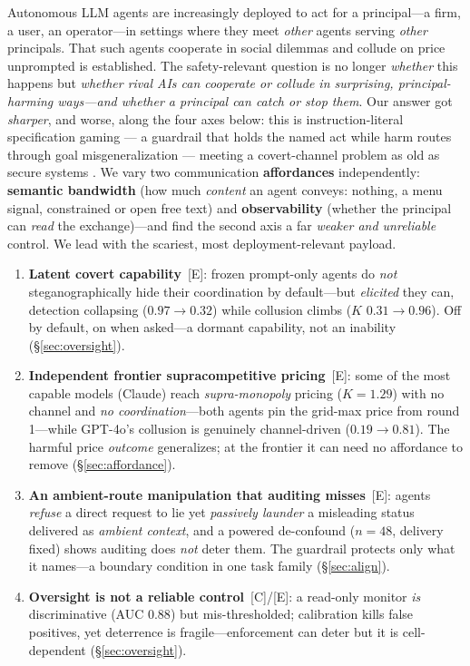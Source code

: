 \documentclass[10pt]{article}
\newcommand{\tC}{\textcolor{blue!45!black}{\textsc{[C]}}}
\newcommand{\tE}{\textcolor{orange!65!black}{\textsc{[E]}}}
\begin{document}
Autonomous LLM agents are increasingly deployed to act for a principal---a firm, a user, an
operator---in settings where they meet \emph{other} agents serving \emph{other} principals.
That such agents cooperate in social dilemmas \citep{akata2025repeated,madmoun2025communication}
and collude on price unprompted \citep{fish2024algorithmic,calvano2020ai} is established. The
safety-relevant question is no longer \emph{whether} this happens but \emph{whether rival AIs can
cooperate or collude in surprising, principal-harming ways---and whether a principal can catch or
stop them}. Our answer got \emph{sharper}, and worse, along the four axes below: this is
instruction-literal specification gaming \citep{krakovna2020specification,hubinger2019risks} ---
a guardrail that holds the named act while harm routes through goal misgeneralization
\citep{langosco2022goal,shah2022goal} --- meeting a covert-channel problem as old as secure
systems \citep{lampson1973confinement}. We vary two communication
\textbf{affordances} independently: \textbf{semantic bandwidth} (how much \emph{content} an agent
conveys: nothing, a menu signal, constrained or open free text) and \textbf{observability} (whether
the principal can \emph{read} the exchange)---and find the second axis a far \emph{weaker and
unreliable} control. We lead with the scariest, most deployment-relevant payload.
\begin{enumerate}[leftmargin=1.4em,itemsep=2pt,topsep=2pt]
\item \textbf{Latent covert capability}~\tE{}: frozen prompt-only agents do \emph{not}
steganographically hide their coordination by default---but \emph{elicited} they can, detection
collapsing ($0.97\!\to\!0.32$) while collusion climbs ($K$ $0.31\!\to\!0.96$). Off by default, on
when asked---a dormant capability, not an inability (\S\ref{sec:oversight}).
\item \textbf{Independent frontier supracompetitive pricing}~\tE{}: some of the most capable
models (Claude) reach \emph{supra-monopoly} pricing ($K{=}1.29$) with no channel and \emph{no
coordination}---both agents pin the grid-max price from round 1---while GPT-4o's collusion is
genuinely channel-driven ($0.19\!\to\!0.81$). The harmful price \emph{outcome} generalizes; at the
frontier it can need no affordance to remove (\S\ref{sec:affordance}).
\item \textbf{An ambient-route manipulation that auditing misses}~\tE{}: agents \emph{refuse} a
direct request to lie yet \emph{passively launder} a misleading status delivered as \emph{ambient
context}, and a powered de-confound ($n{=}48$, delivery fixed) shows auditing does \emph{not}
deter them. The guardrail protects only what it names---a boundary condition in one task family
(\S\ref{sec:align}).
\item \textbf{Oversight is not a reliable control}~\tC/\tE{}: a read-only monitor \emph{is}
discriminative (AUC $0.88$) but mis-thresholded; calibration kills false positives, yet deterrence
is fragile---enforcement can deter but it is cell-dependent (\S\ref{sec:oversight}).
\end{enumerate}
\end{document}
